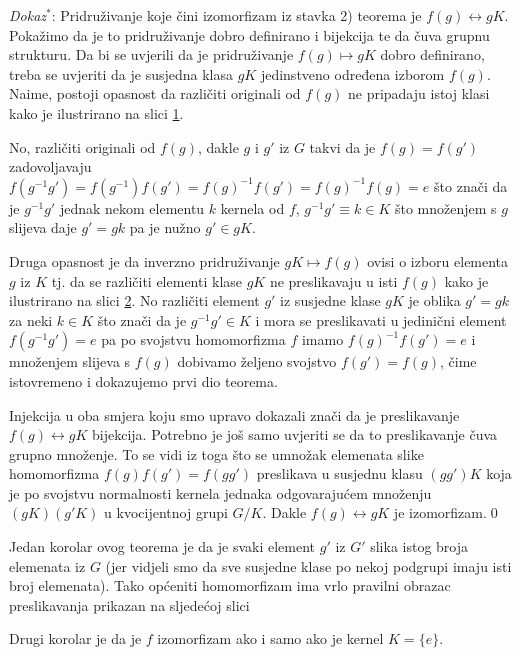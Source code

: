 \emph{Dokaz}$^{*}$: Pridruživanje koje
čini izomorfizam iz stavka 2) teorema je $f(g)\leftrightarrow gK$.
Pokažimo da je to pridruživanje dobro definirano i bijekcija te da čuva grupnu
strukturu.
Da bi se uvjerili da je pridruživanje $f(g)\mapsto gK$ dobro definirano, treba
se uvjeriti da je susjedna klasa $gK$ jedinstveno određena izborom $f(g)$. Naime,
postoji opasnost da različiti originali od $f(g)$ ne pripadaju istoj klasi
kako je ilustrirano na slici \ref{fig:homo1}.
\begin{figure}[ht]
    \centering
    
    \caption{\label{fig:homo1}}
\end{figure}
\begin{figure}[ht]
    \centering
    
    \caption{\label{fig:homo2}}
\end{figure}
No, različiti originali od $f(g)$, dakle $g$ i $g'$ iz $G$
takvi da je  $f(g)=f(g')$ zadovoljavaju
$f(g^{-1} g')=f(g^{-1})f(g')=f(g)^{-1}f(g')=f(g)^{-1}f(g)=e$ što  znači
da je $g^{-1} g'$ jednak nekom elementu $k$ kernela od $f$,
$g^{-1} g' \equiv k\in K$ što množenjem s $g$ slijeva
daje $g'=gk$ pa je nužno $g' \in gK$.

Druga opasnost je da inverzno pridruživanje
$gK\mapsto f(g)$ ovisi o izboru elementa $g$ iz $K$ tj. da
se različiti elementi klase $gK$ ne preslikavaju u isti $f(g)$
kako je ilustrirano na slici \ref{fig:homo2}.
No različiti element $g'$ iz susjedne klase $gK$ je oblika $g'=gk$ za neki
$k\in K$ što znači da je $g^{-1} g'\in K$ i mora se preslikavati
u jedinični element
$f(g^{-1}g')=e$ pa po svojstvu homomorfizma $f$ imamo 
$f(g)^{-1}f(g')=e$ i množenjem slijeva s $f(g)$ dobivamo željeno
svojstvo $f(g')=f(g)$, čime istovremeno i dokazujemo prvi dio teorema.

Injekcija u oba smjera koju smo upravo dokazali znači da je
preslikavanje $f(g)\leftrightarrow gK$ bijekcija. Potrebno je još samo
uvjeriti se da to preslikavanje čuva grupno množenje. To se vidi iz toga
što se umnožak elemenata slike homomorfizma $f(g)f(g')=f(gg')$ preslikava
u susjednu klasu $(gg')K$ koja je po svojstvu normalnosti kernela jednaka
odgovarajućem množenju $(gK)(g'K)$ u kvocijentnoj grupi $G/K$.
Dakle $f(g)\leftrightarrow gK$ je izomorfizam.\qed
  


Jedan korolar ovog teorema je da je svaki element $g'$ iz $G'$ slika
istog broja elemenata iz $G$ (jer vidjeli smo da sve susjedne klase po
nekoj podgrupi imaju isti broj elemenata). Tako općeniti homomorfizam
ima vrlo pravilni obrazac preslikavanja prikazan na sljedećoj slici\\[2ex]
\vspace*{4ex}
\centerline{}
Drugi korolar je da je $f$ izomorfizam ako i
samo ako je kernel $K=\{e\}$.

